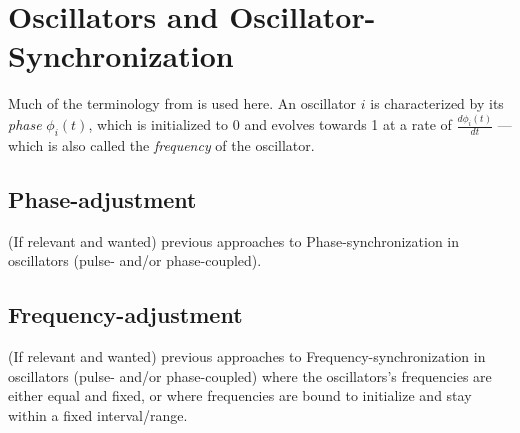 
\section{Oscillators and Oscillator-Synchronization}

	
	
	Much of the terminology from \cite{nymoen_synch} is used here. An oscillator $i$ is characterized by its \textit{phase} $\phi_i(t)$, which is initialized to 0 and evolves towards 1 at a rate of $\frac{d \phi_i(t)}{d t}$ — which is also called the \textit{frequency} of the oscillator.
	
	\subsection{Phase-adjustment}
				
	(If relevant and wanted) previous approaches to Phase-synchronization in oscillators (pulse- and/or phase-coupled).
		
	\subsection{Frequency-adjustment}
	
	(If relevant and wanted) previous approaches to Frequency-synchronization in oscillators (pulse- and/or phase-coupled)  where the oscillators's frequencies are either equal and fixed, or where frequencies are bound to initialize and stay within a fixed interval/range.